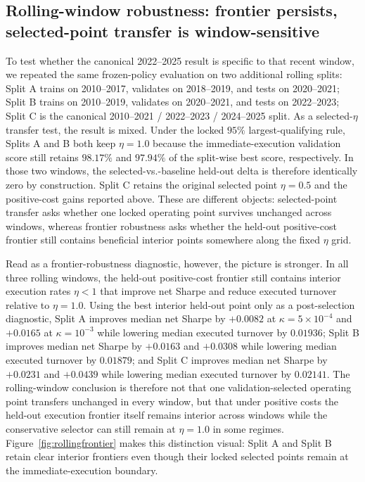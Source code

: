 \documentclass[10pt,twocolumn]{article}
\begin{document}
\subsection{Rolling-window robustness: frontier persists, selected-point transfer is window-sensitive}
To test whether the canonical 2022--2025 result is specific to that recent window, we repeated the same frozen-policy evaluation on two additional rolling splits: Split A trains on 2010--2017, validates on 2018--2019, and tests on 2020--2021; Split B trains on 2010--2019, validates on 2020--2021, and tests on 2022--2023; Split C is the canonical 2010--2021 / 2022--2023 / 2024--2025 split. As a selected-$\eta$ transfer test, the result is mixed. Under the locked $95\%$ largest-qualifying rule, Splits A and B both keep $\eta=1.0$ because the immediate-execution validation score still retains $98.17\%$ and $97.94\%$ of the split-wise best score, respectively. In those two windows, the selected-vs.-baseline held-out delta is therefore identically zero by construction. Split C retains the original selected point $\eta=0.5$ and the positive-cost gains reported above.
These are different objects: selected-point transfer asks whether one locked operating point survives unchanged across windows, whereas frontier robustness asks whether the held-out positive-cost frontier still contains beneficial interior points somewhere along the fixed $\eta$ grid.

Read as a frontier-robustness diagnostic, however, the picture is stronger. In all three rolling windows, the held-out positive-cost frontier still contains interior execution rates $\eta<1$ that improve net Sharpe and reduce executed turnover relative to $\eta=1.0$. Using the best interior held-out point only as a post-selection diagnostic, Split A improves median net Sharpe by $+0.0082$ at $\kappa=5\times10^{-4}$ and $+0.0165$ at $\kappa=10^{-3}$ while lowering median executed turnover by $0.01936$; Split B improves median net Sharpe by $+0.0163$ and $+0.0308$ while lowering median executed turnover by $0.01879$; and Split C improves median net Sharpe by $+0.0231$ and $+0.0439$ while lowering median executed turnover by $0.02141$. The rolling-window conclusion is therefore not that one validation-selected operating point transfers unchanged in every window, but that under positive costs the held-out execution frontier itself remains interior across windows while the conservative selector can still remain at $\eta=1.0$ in some regimes. Figure~\ref{fig:rollingfrontier} makes this distinction visual: Split A and Split B retain clear interior frontiers even though their locked selected points remain at the immediate-execution boundary.
\end{document}
